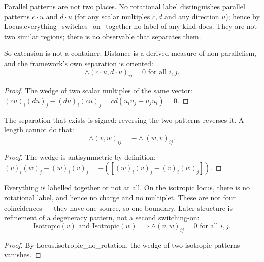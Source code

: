 \begin{theorem}
Parallel patterns are not two places.  No rotational label distinguishes parallel patterns $c \cdot u$ and $d \cdot u$ (for any scalar multiples $c, d$ and any direction $u$); hence by Locus.everything\_switches\_on\_together no label of any kind does.  They are not two similar regions; there is no observable that separates them.

So extension is not a container.  Distance is a derived measure of non-parallelism, and the framework's own separation is oriented:
\begin{equation}
\wedge(c \cdot u, d \cdot u)_{ij} = 0 \text{ for all } i, j.
\end{equation}
\begin{proof}
The wedge of two scalar multiples of the same vector: $(cu)_i (du)_j - (du)_i (cu)_j = cd(u_i u_j - u_j u_i) = 0$.
\end{proof}
\end{theorem}

\begin{theorem}
The separation that exists is signed: reversing the two patterns reverses it.  A length cannot do that:
\begin{equation}
\wedge(v, w)_{ij} = -\wedge(w, v)_{ij}.
\end{equation}
\begin{proof}
The wedge is antisymmetric by definition: $(v)_i (w)_j - (w)_i (v)_j = -([(w)_i (v)_j - (v)_i (w)_j])$.
\end{proof}
\end{theorem}

\begin{theorem}
Everything is labelled together or not at all.  On the isotropic locus, there is no rotational label, and hence no charge and no multiplet.  These are not four coincidences — they have one source, so one boundary.  Later structure is refinement of a degeneracy pattern, not a second switching-on:
\begin{equation}
\text{Isotropic}(v) \text{ and } \text{Isotropic}(w) \implies \wedge(v, w)_{ij} = 0 \text{ for all } i, j.
\end{equation}
\begin{proof}
By Locus.isotropic\_no\_rotation, the wedge of two isotropic patterns vanishes.
\end{proof}
\end{theorem}

